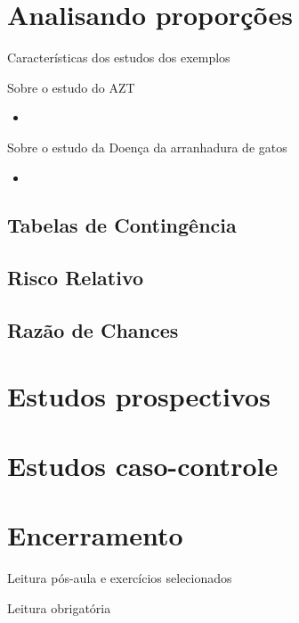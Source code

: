 \documentclass{beamer}
\begin{document}
\section{Analisando proporções}

\begin{frame}{Características dos estudos dos exemplos}
  \begin{block}{Sobre o estudo do AZT}
    \begin{itemize}
    \item 
    \end{itemize}
  \end{block}
  \begin{block}{Sobre o estudo da Doença da arranhadura de gatos}
    \begin{itemize}
    \item 
    \end{itemize}
  \end{block}
\end{frame}

\subsection{Tabelas de Contingência}

\subsection{Risco Relativo}

\subsection{Razão de Chances}

\section{Estudos prospectivos}

\section{Estudos caso-controle}

\section{Encerramento}

\begin{frame}{Leitura pós-aula e exercícios selecionados}
  \begin{block}{Leitura obrigatória}

  \end{block}
  \begin{itemize}
  \end{itemize}
\end{frame}
\end{document}
